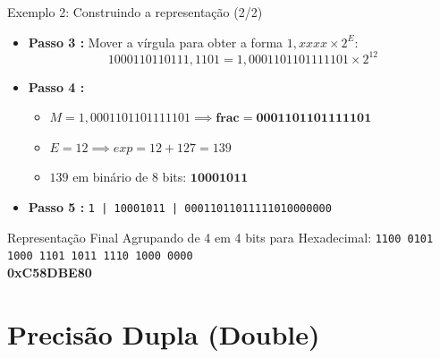 \begin{frame}{Exemplo 2: Construindo a representação (2/2)}
    \begin{itemize}
        \item \textbf{Passo 3 :}
              Mover a vírgula para obter a forma $1,xxxx \times 2^E$:
              $$1000110110111,1101 = 1,0001101101111101 \times 2^{12}$$
        \item \textbf{Passo 4 :}
              \begin{itemize}
                  \item $M = 1,0001101101111101 \implies \mathbf{frac = 0001101101111101}$
                  \item $E = 12 \implies exp = 12 + 127 = 139$
                  \item $139$ em binário de 8 bits: $\mathbf{10001011}$
              \end{itemize}
        \item \textbf{Passo 5 :}
              \texttt{1 | 10001011 | 00011011011111010000000}
    \end{itemize}

    \begin{block}{Representação Final}
        Agrupando de 4 em 4 bits para Hexadecimal:
        \texttt{1100 0101 1000 1101 1011 1110 1000 0000} \\
        \centering \Large \textbf{0xC58DBE80}
    \end{block}
\end{frame}

\section{Precisão Dupla (Double)}


